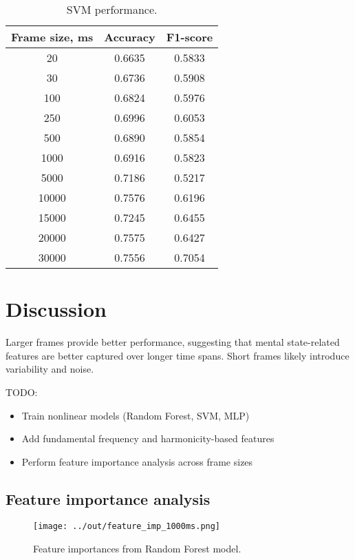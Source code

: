 \documentclass[conference]{IEEEtran}
\begin{document}

\begin{table}[h]
\centering
\caption{SVM performance.}
\begin{tabular}{|c|c|c|}
\hline
\textbf{Frame size, ms} & \textbf{Accuracy} & \textbf{F1-score}\\
\hline
20 & 0.6635 & 0.5833 \\
\hline
30 & 0.6736 & 0.5908 \\
\hline
100 & 0.6824 & 0.5976 \\
\hline
250 & 0.6996 & 0.6053 \\
\hline
500 & 0.6890 & 0.5854 \\
\hline
1000 & 0.6916 & 0.5823 \\
\hline
5000 & 0.7186 & 0.5217 \\
\hline
10000 & 0.7576 & 0.6196 \\
\hline
15000 & 0.7245 & 0.6455 \\
\hline
20000 & 0.7575 & 0.6427 \\
\hline
30000 & 0.7556 & 0.7054 \\
\hline
\end{tabular}
\label{tab:svm_perf}
\end{table}

\section{Discussion}
Larger frames provide better performance, suggesting that mental state-related features are better captured over longer time spans. 
Short frames likely introduce variability and noise.

TODO:
\begin{itemize}
    \item Train nonlinear models (Random Forest, SVM, MLP)
    \item Add fundamental frequency and harmonicity-based features
    \item Perform feature importance analysis across frame sizes
\end{itemize}

\subsection{Feature importance analysis}
\begin{figure}[h]
    \centering
    \texttt{[image: ../out/feature\_imp\_1000ms.png]}
    \caption{Feature importances from Random Forest model.}
    \label{fig:feature_importance}
\end{figure}
\end{document}
